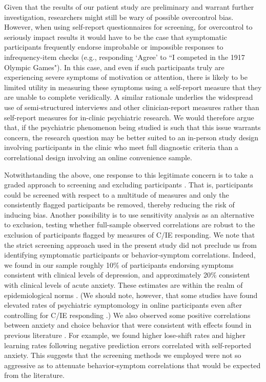 \documentclass[a4paper,notitlepage,12pt]{article}
\begin{document}
\begin{refsection}[main]
Given that the results of our patient study are preliminary and warrant further investigation, researchers might still be wary of possible overcontrol bias. However, when using self-report questionnaires for screening, for overcontrol to seriously impact results it would have to be the case that symptomatic participants frequently endorse improbable or impossible responses to infrequency-item checks (e.g., responding `Agree' to ``I competed in the 1917 Olympic Games"). In this case, and even if such participants truly are experiencing severe symptoms of motivation or attention, there is likely to be limited utility in measuring these symptoms using a self-report measure that they are unable to complete veridically. A similar rationale underlies the widespread use of semi-structured interviews and other clinician-report measures rather than self-report measures for in-clinic psychiatric research. We would therefore argue that, if the psychiatric phenomenon being studied is such that this issue warrants concern, the research question may be better suited to an in-person study design involving participants in the clinic who meet full diagnostic criteria than a correlational design involving an online convenience sample.

Notwithstanding the above, one response to this legitimate concern is to take a graded approach to screening and excluding participants \cite{Kim2018-ev}. That is, participants could be screened with respect to a multitude of measures and only the consistently flagged participants be removed, thereby reducing the risk of inducing bias. Another possibility is to use sensitivity analysis as an alternative to exclusion, testing whether full-sample observed correlations are robust to the exclusion of participants flagged by measures of C/IE responding. We note that the strict screening approach used in the present study did not preclude us from identifying symptomatic participants or behavior-symptom correlations. Indeed, we found in our sample roughly 10\% of participants endorsing symptoms consistent with clinical levels of depression, and approximately 20\% consistent with clinical levels of acute anxiety. These estimates are within the realm of epidemiological norms \cite{kessler2012twelve, lowe2008validation, yarrington2021impact}. (We should note, however, that some studies have found elevated rates of psychiatric symptomology in online participants even after controlling for C/IE responding \cite{ophir2020turker}.) We also observed some positive correlations between anxiety and choice behavior that were consistent with effects found in previous literature \cite{huang2017computational, harle2017anhedonia, garrett2018updating}. For example, we found higher lose-shift rates and higher learning rates following negative prediction errors correlated with self-reported anxiety. This suggests that the screening methods we employed were not so aggressive as to attenuate behavior-symptom correlations that would be expected from the literature. 


\end{refsection}
\end{document}
